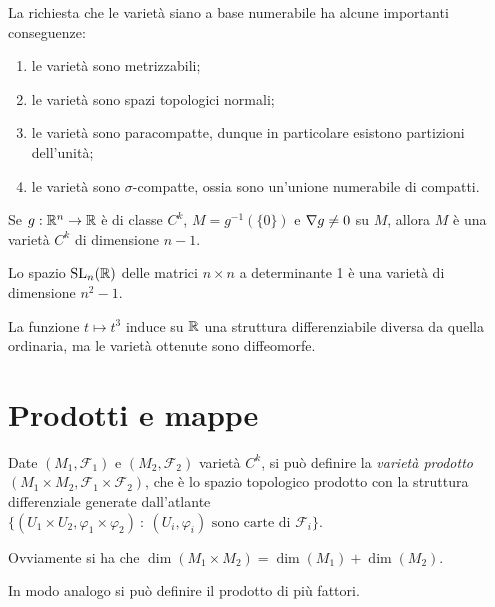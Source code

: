  \begin{remark}
  La richiesta che le varietà siano a base numerabile ha alcune importanti conseguenze:
  \begin{enumerate}
   \item le varietà sono metrizzabili;
   \item le varietà sono spazi topologici normali;
   \item le varietà sono paracompatte, dunque in particolare esistono partizioni dell'unità;
   \item le varietà sono $\sigma$-compatte, ossia sono un'unione numerabile di compatti.
  \end{enumerate}
 \end{remark}

\begin{exercise}
	Se $g:\mathbb R^n\to\mathbb R$ è di classe $C^k$, $M=g^{-1}(\{0\})$ e $\nabla g\ne 0$ su $M$, allora $M$ è una varietà $C^k$ di dimensione $n-1$.
\end{exercise}
\begin{exercise}
	Lo spazio $\mathrm{SL}_n(\mathbb R)$ delle matrici $n\times n$ a determinante 1 è una varietà di dimensione $n^2-1$.
\end{exercise}
\begin{exercise}
	La funzione $t\mapsto t^3$ induce su $\mathbb R$ una struttura differenziabile diversa da quella ordinaria, ma le varietà ottenute sono diffeomorfe.
\end{exercise}
 
 \section{Prodotti e mappe}
 
\begin{definition} 
	Date $(M_1,\mathcal F_1)$ e $(M_2,\mathcal F_2)$ varietà $C^k$, si può definire la \emph{varietà prodotto} $(M_1\times M_2,\mathcal F_1\times\mathcal F_2)$, che è lo spazio topologico prodotto con la struttura differenziale generate dall'atlante $\{(U_1\times U_2,\varphi_1\times\varphi_2)\ :\ \text{$(U_i,\varphi_i)$ sono carte di $\mathcal F_i$}\}$.
\end{definition}

\begin{remark}
	Ovviamente si ha che $\dim(M_1\times M_2)=\dim(M_1)+\dim(M_2)$.
\end{remark}

In modo analogo si può definire il prodotto di più fattori.
 
